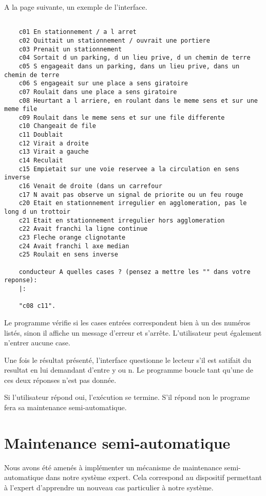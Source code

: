A la page suivante, un exemple de l'interface.

\newpage

\begin{lstlisting}[frame=single]

    c01 En stationnement / a l arret
    c02 Quittait un stationnement / ouvrait une portiere
    c03 Prenait un stationnement
    c04 Sortait d un parking, d un lieu prive, d un chemin de terre
    c05 S engageait dans un parking, dans un lieu prive, dans un chemin de terre
    c06 S engageait sur une place a sens giratoire
    c07 Roulait dans une place a sens giratoire
    c08 Heurtant a l arriere, en roulant dans le meme sens et sur une meme file
    c09 Roulait dans le meme sens et sur une file differente
    c10 Changeait de file
    c11 Doublait
    c12 Virait a droite
    c13 Virait a gauche
    c14 Reculait
    c15 Empietait sur une voie reservee a la circulation en sens inverse
    c16 Venait de droite (dans un carrefour
    c17 N avait pas observe un signal de priorite ou un feu rouge
    c20 Etait en stationnement irregulier en agglomeration, pas le long d un trottoir
    c21 Etait en stationnement irregulier hors agglomeration
    c22 Avait franchi la ligne continue
    c23 Fleche orange clignotante
    c24 Avait franchi l axe median
    c25 Roulait en sens inverse

    conducteur A quelles cases ? (pensez a mettre les "" dans votre reponse):
    |: 

    "c08 c11".
\end{lstlisting}

Le programme vérifie si les cases entrées correspondent bien à un des numéros listés, sinon il affiche un message d'erreur et s'arrête.
L'utilisateur peut également n'entrer aucune case.

Une fois le résultat présenté, l'interface questionne le lecteur s'il est satifait du resultat en lui demandant d'entre y ou n. Le programme boucle tant qu'une de ces deux réponses n'est pas donnée.

Si l'utilisateur répond oui, l'exécution se termine. S'il répond non le programe fera sa maintenance semi-automatique.

\section{Maintenance semi-automatique}
Nous avons été amenés à implémenter un mécanisme de maintenance semi-automatique dans notre système expert. Cela correspond au dispositif permettant à l'expert d'apprendre un nouveau cas particulier à notre système.

